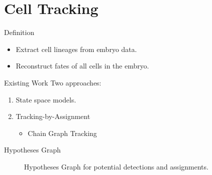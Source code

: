 \section{Cell Tracking}

\begin{frame}{Definition}
    \begin{itemize}
          \item Extract cell lineages from embryo data.
          \item Reconstruct fates of all cells in the embryo.
    \end{itemize}
\end{frame}

\begin{frame}{Existing Work}
    Two approaches:
    \begin{enumerate}
          \item State space models.
          \item Tracking-by-Assignment
        \begin{itemize}
              \item Chain Graph Tracking
        \end{itemize}
    \end{enumerate}
\end{frame}

\begin{frame}{Hypotheses Graph}
    \begin{figure}
        \centering
        \begin{subfigure}[b]{0.44\textwidth}
            \scalebox{0.62}{
                \begin{tikzpicture}[minimum size=58pt,scale=0.45, every node/.style={scale=0.45, text=black, font=\LARGE}, thick]
                    
                \end{tikzpicture}
            }
        \end{subfigure}
        \hfill
        \begin{subfigure}[b]{0.44\textwidth}
            \scalebox{0.62}{
                \begin{tikzpicture}[minimum size=58pt,scale=0.45, every node/.style={scale=0.45, text=black, font=\LARGE}, thick]
                    
                \end{tikzpicture}
            }
        \end{subfigure}
        \caption{Hypotheses Graph for potential detections and assignments.}
        \label{fig:cell-tracking-hypotheses}
    \end{figure}
\end{frame}

